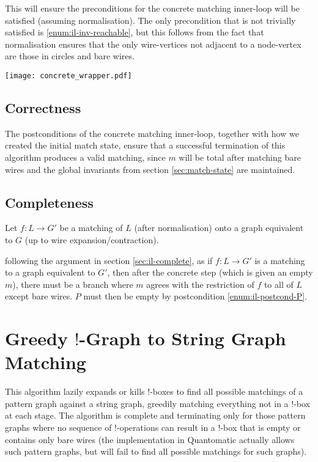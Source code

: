 \documentclass{article}
\begin{document}
This will ensure the preconditions for the concrete matching inner-loop will be satisfied (assuming normalisation).  The only precondition that is not trivially satisfied is \ref{enum:il-inv-reachable}, but this follows from the fact that normalisation ensures that the only wire-vertices not adjacent to a node-vertex are those in circles and bare wires.

\begin{center}
  \texttt{[image: concrete\_wrapper.pdf]}
\end{center}

\subsection{Correctness}

The postconditions of the concrete matching inner-loop, together with how we created the initial match state, ensure that a successful termination of this algorithm produces a valid matching, since $m$ will be total after matching bare wires and the global invariants from section \ref{sec:match-state} are maintained.

\subsection{Completeness}

Let $f:L \rightarrow G'$ be a matching of $L$ (after normalisation) onto a graph equivalent to $G$ (up to wire expansion/contraction).

following the argument in section \ref{sec:il-complete}, as if $f:L \rightarrow G'$ is a matching to a graph equivalent to $G'$, then after the concrete step (which is given an empty $m$), there must be a branch where $m$ agrees with the restriction of $f$ to all of $L$ except bare wires.  $P$ must then be empty by postcondition \ref{enum:il-postcond-P}.

\section{Greedy $!$-Graph to String Graph Matching}
\label{sec:full-wrapper}

This algorithm lazily expands or kills $!$-boxes to find all possible matchings of a pattern graph against a string graph, greedily matching everything not in a $!$-box at each stage.  The algorithm is complete and terminating only for those pattern graphs where no sequence of $!$-operations can result in a $!$-box that is empty or contains only bare wires (the implementation in Quantomatic actually allows such pattern graphs, but will fail to find all possible matchings for such graphs).
\end{document}
